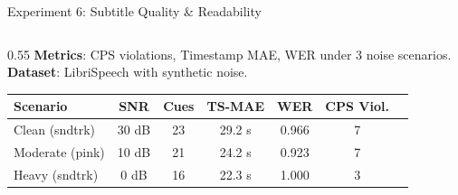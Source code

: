 \documentclass[aspectratio=169]{beamer}
\begin{document}
\begin{frame}{Experiment 6: Subtitle Quality \& Readability}
  \begin{columns}[T]
    \begin{column}{0.55\textwidth}
      \textbf{Metrics}: CPS violations, Timestamp MAE, WER under 3 noise scenarios.\\
      \textbf{Dataset}: LibriSpeech with synthetic noise.

      \vspace{0.3cm}
      \begin{center}
        \small
        \begin{tabular}{@{}lcccccc@{}}
          \toprule
          \textbf{Scenario} & \textbf{SNR} & \textbf{Cues} & \textbf{TS-MAE} & \textbf{WER} & \textbf{CPS Viol.} \\
          \midrule
          Clean (sndtrk) & 30 dB & 23 & 29.2 s & 0.966 & 7 \\
          Moderate (pink) & 10 dB & 21 & 24.2 s & 0.923 & 7 \\
          Heavy (sndtrk) & 0 dB & 16 & 22.3 s & 1.000 & 3 \\
          \bottomrule
        \end{tabular}
      \end{center}


\end{column}
\end{columns}
\end{frame}
\end{document}
